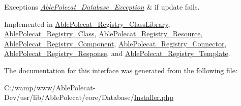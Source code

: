 \begin{DoxyExceptions}{Exceptions}
{\em \hyperlink{class_able_polecat___database___exception}{Able\+Polecat\+\_\+\+Database\+\_\+\+Exception}} & if update fails. \\
\hline
\end{DoxyExceptions}


Implemented in \hyperlink{class_able_polecat___registry___class_library_a00ce4d238d0651db584337f8e0b38c68}{Able\+Polecat\+\_\+\+Registry\+\_\+\+Class\+Library}, \hyperlink{class_able_polecat___registry___class_a00ce4d238d0651db584337f8e0b38c68}{Able\+Polecat\+\_\+\+Registry\+\_\+\+Class}, \hyperlink{class_able_polecat___registry___resource_a00ce4d238d0651db584337f8e0b38c68}{Able\+Polecat\+\_\+\+Registry\+\_\+\+Resource}, \hyperlink{class_able_polecat___registry___component_a00ce4d238d0651db584337f8e0b38c68}{Able\+Polecat\+\_\+\+Registry\+\_\+\+Component}, \hyperlink{class_able_polecat___registry___connector_a00ce4d238d0651db584337f8e0b38c68}{Able\+Polecat\+\_\+\+Registry\+\_\+\+Connector}, \hyperlink{class_able_polecat___registry___response_a00ce4d238d0651db584337f8e0b38c68}{Able\+Polecat\+\_\+\+Registry\+\_\+\+Response}, and \hyperlink{class_able_polecat___registry___template_a00ce4d238d0651db584337f8e0b38c68}{Able\+Polecat\+\_\+\+Registry\+\_\+\+Template}.



The documentation for this interface was generated from the following file\+:\begin{DoxyCompactItemize}
\item 
C\+:/wamp/www/\+Able\+Polecat-\/\+Dev/usr/lib/\+Able\+Polecat/core/\+Database/\hyperlink{_installer_8php}{Installer.\+php}\end{DoxyCompactItemize}
